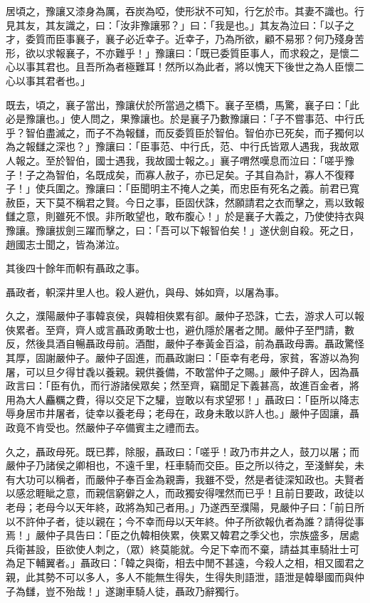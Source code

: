 \begin{pinyinscope}
居頃之，豫讓又漆身為厲，吞炭為啞，使形狀不可知，行乞於市。其妻不識也。行見其友，其友識之，曰：「汝非豫讓邪？」曰：「我是也。」其友為泣曰：「以子之才，委質而臣事襄子，襄子必近幸子。近幸子，乃為所欲，顧不易邪？何乃殘身苦形，欲以求報襄子，不亦難乎！」豫讓曰：「既已委質臣事人，而求殺之，是懷二心以事其君也。且吾所為者極難耳！然所以為此者，將以愧天下後世之為人臣懷二心以事其君者也。」

既去，頃之，襄子當出，豫讓伏於所當過之橋下。襄子至橋，馬驚，襄子曰：「此必是豫讓也。」使人問之，果豫讓也。於是襄子乃數豫讓曰：「子不嘗事范、中行氏乎？智伯盡滅之，而子不為報讎，而反委質臣於智伯。智伯亦已死矣，而子獨何以為之報讎之深也？」豫讓曰：「臣事范、中行氏，范、中行氏皆眾人遇我，我故眾人報之。至於智伯，國士遇我，我故國士報之。」襄子喟然嘆息而泣曰：「嗟乎豫子！子之為智伯，名既成矣，而寡人赦子，亦已足矣。子其自為計，寡人不復釋子！」使兵圍之。豫讓曰：「臣聞明主不掩人之美，而忠臣有死名之義。前君已寬赦臣，天下莫不稱君之賢。今日之事，臣固伏誅，然願請君之衣而擊之，焉以致報讎之意，則雖死不恨。非所敢望也，敢布腹心！」於是襄子大義之，乃使使持衣與豫讓。豫讓拔劍三躍而擊之，曰：「吾可以下報智伯矣！」遂伏劍自殺。死之日，趙國志士聞之，皆為涕泣。

其後四十餘年而軹有聶政之事。

聶政者，軹深井里人也。殺人避仇，與母、姊如齊，以屠為事。

久之，濮陽嚴仲子事韓哀侯，與韓相俠累有卻。嚴仲子恐誅，亡去，游求人可以報俠累者。至齊，齊人或言聶政勇敢士也，避仇隱於屠者之閒。嚴仲子至門請，數反，然後具酒自暢聶政母前。酒酣，嚴仲子奉黃金百溢，前為聶政母壽。聶政驚怪其厚，固謝嚴仲子。嚴仲子固進，而聶政謝曰：「臣幸有老母，家貧，客游以為狗屠，可以旦夕得甘毳以養親。親供養備，不敢當仲子之賜。」嚴仲子辟人，因為聶政言曰：「臣有仇，而行游諸侯眾矣；然至齊，竊聞足下義甚高，故進百金者，將用為大人麤糲之費，得以交足下之驩，豈敢以有求望邪！」聶政曰：「臣所以降志辱身居市井屠者，徒幸以養老母；老母在，政身未敢以許人也。」嚴仲子固讓，聶政竟不肯受也。然嚴仲子卒備賓主之禮而去。

久之，聶政母死。既已葬，除服，聶政曰：「嗟乎！政乃市井之人，鼓刀以屠；而嚴仲子乃諸侯之卿相也，不遠千里，枉車騎而交臣。臣之所以待之，至淺鮮矣，未有大功可以稱者，而嚴仲子奉百金為親壽，我雖不受，然是者徒深知政也。夫賢者以感忿睚眦之意，而親信窮僻之人，而政獨安得嘿然而已乎！且前日要政，政徒以老母；老母今以天年終，政將為知己者用。」乃遂西至濮陽，見嚴仲子曰：「前日所以不許仲子者，徒以親在；今不幸而母以天年終。仲子所欲報仇者為誰？請得從事焉！」嚴仲子具告曰：「臣之仇韓相俠累，俠累又韓君之季父也，宗族盛多，居處兵衛甚設，臣欲使人刺之，（眾）終莫能就。今足下幸而不棄，請益其車騎壯士可為足下輔翼者。」聶政曰：「韓之與衛，相去中閒不甚遠，今殺人之相，相又國君之親，此其勢不可以多人，多人不能無生得失，生得失則語泄，語泄是韓舉國而與仲子為讎，豈不殆哉！」遂謝車騎人徒，聶政乃辭獨行。


\end{pinyinscope}
